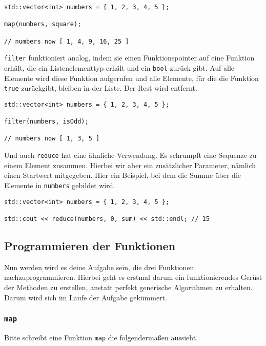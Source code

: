 \begin{lstlisting}
std::vector<int> numbers = { 1, 2, 3, 4, 5 };

map(numbers, square);

// numbers now [ 1, 4, 9, 16, 25 ]
\end{lstlisting}

\lstinline{filter} funktioniert analog, indem sie einen Funktionspointer auf eine Funktion erhält, die ein Listenelementtyp erhält und ein \lstinline{bool} zurück gibt.
Auf alle Elemente wird diese Funktion aufgerufen und alle Elemente, für die die Funktion \lstinline{true} zurückgibt, bleiben in der Liste. Der Rest wird entfernt. \\

\begin{lstlisting}
std::vector<int> numbers = { 1, 2, 3, 4, 5 };

filter(numbers, isOdd);

// numbers now [ 1, 3, 5 ]
\end{lstlisting}

Und auch \lstinline{reduce} hat eine ähnliche Verwendung.
Es schrumpft eine Sequenze zu einem Element zusammen.
Hierbei wir aber ein zusätzlicher Parameter, nämlich einen Startwert mitgegeben.
Hier ein Beispiel, bei dem die Summe über die Elemente in \lstinline{numbers} gebildet wird.

\begin{lstlisting}
std::vector<int> numbers = { 1, 2, 3, 4, 5 };

std::cout << reduce(numbers, 0, sum) << std::endl; // 15
\end{lstlisting}

\subsection{Programmieren der Funktionen}

Nun werden wird es deine Aufgabe sein, die drei Funktionen nachzuprogrammieren.
Hierbei geht es erstmal darum ein funktionierendes Gerüst der Methoden zu erstellen, anstatt perfekt generische Algorithmen zu erhalten.
Darum wird sich im Laufe der Aufgabe gekümmert.

\subsubsection{\lstinline{map}}

Bitte schreibt eine Funktion \lstinline{map} die folgendermaßen aussieht.

